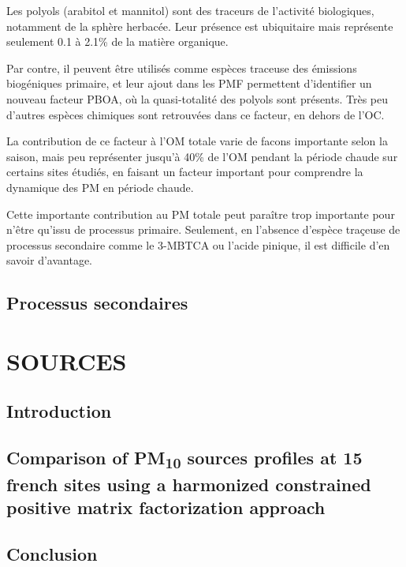Les polyols (arabitol et mannitol) sont des traceurs de l'activité biologiques, notamment
de la sphère herbacée. Leur présence est ubiquitaire mais représente seulement 0.1 à 2.1\%
de la matière organique.

Par contre, il peuvent être utilisés comme espèces traceuse des émissions biogéniques
primaire, et leur ajout dans les PMF permettent d'identifier un nouveau facteur PBOA,
où la quasi-totalité des polyols sont présents. Très peu d'autres espèces chimiques sont
retrouvées dans ce facteur, en dehors de l'OC.

La contribution de ce facteur à l'OM totale varie de facons importante selon la saison, mais
peu représenter jusqu'à 40\% de l'OM pendant la période chaude sur certains sites étudiés,
en faisant un facteur important pour comprendre la dynamique des PM en période chaude.

Cette importante contribution au PM totale peut paraître trop importante pour n'être
qu'issu de processus primaire. Seulement, en l'absence d'espèce traçeuse de processus
secondaire comme le 3-MBTCA ou l'acide pinique, il est difficile d'en savoir d'avantage.

\subsection{Processus secondaires}%
\label{sub:processus_secondaires}

\section{SOURCES}%
\label{sec:sources}

\subsection{Introduction}

\subsection{Comparison of PM\textsubscript{10} sources profiles at 15 french sites using a harmonized constrained positive matrix factorization approach}%
\label{sub:article}

\subsection{Conclusion}%
\label{sub:conclusion}



